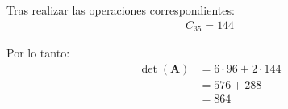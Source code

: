 \documentclass{report} %
\begin{document}
Tras realizar las operaciones correspondientes:
\begin{align*}
C_{35} = 144
\end{align*}

Por lo tanto:
\begin{align*}
\det(\mathbf{A}) &= 6 \cdot 96 + 2 \cdot 144 \\
&= 576 + 288 \\
&= 864
\end{align*}



% 


% 
% 

% 

% 






% 
\end{document}
